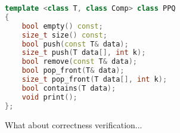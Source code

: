 \begin{lstlisting}[language=C++,basicstyle=\tt\footnotesize,captionpos=b,caption=PPQ interface,morekeywords={*, size_t}]
template <class T, class Comp> class PPQ
{
	bool empty() const;
	size_t size() const;
	bool push(const T& data);
	size_t push(T data[], int k);
	bool remove(const T& data);
	bool pop_front(T& data);
	size_t pop_front(T data[], int k);
	bool contains(T data);
	void print();
};
\end{lstlisting}

What about correctness verification...
